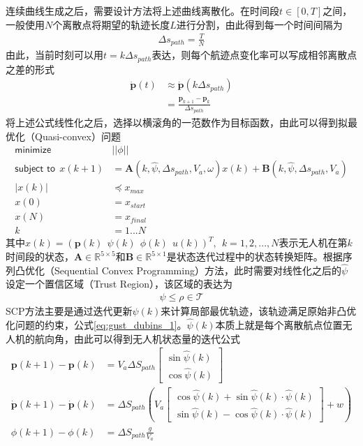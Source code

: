 连续曲线生成之后，需要设计方法将上述曲线离散化。在时间段$t \in [0, T]$之间，一般使用$N$个离散点将期望的轨迹长度$L$进行分割，由此得到每一个时间间隔为
\begin{align}
	\Delta s_{path} = \frac{T}{N}
\end{align}
由此，当前时刻可以用$t =k \Delta s_{path}$表达，则每个航迹点变化率可以写成相邻离散点之差的形式
\begin{align}
	\dot{\mathbf{p}}(t) &\approx \dot{\mathbf{p}}(k \Delta s_{path}) \\
	&= \frac{\mathbf{p}_{k+1}-\mathbf{p}_{k}}{\Delta s_{path}}
\end{align}
将上述公式线性化之后，选择以横滚角的一范数作为目标函数，由此可以得到拟最优化（Quasi-convex）问题
\begin{align}
	\textsf{minimize}\ \ &||\phi|| \\
	\textsf{subject to}\  \ x(k+1) &= \mathbf{A}(k, \hat{\psi}, \Delta s_{path}, {V}_a, \omega)x(k) + \mathbf{B}(k, \hat{\psi}, \Delta s_{path}, {V}_a) \nonumber  \\
	|x(k)| & \preceq x_{max} \nonumber \\
	x(0) &= x_{start} \nonumber \\
	x(N) &= x_{final} \nonumber \\
	k &= 1... N \nonumber
\end{align}
其中$x(k) = (\mathbf{p}(k)\ \ \psi(k)\ \ \phi(k)\ \ u(k))^T,\ \ k=1,2,...,N$表示无人机在第$k$时间段的状态，$\mathbf{A} \in \mathbb{R}^{5\times5}$和$\mathbf{B} \in \mathbb{R}^{5\times1}$是状态迭代过程中的状态转换矩阵。根据序列凸优化（Sequential Convex Programming）方法，此时需要对线性化之后的$\hat\psi$设定一个置信区域（Trust Region），该区域的表达为
\begin{align}
	\psi \le \rho \in \mathcal{T}
\end{align}
SCP方法主要是通过迭代更新$\hat{\psi}(k)$来计算局部最优轨迹，该轨迹满足原始非凸优化问题的约束，公式\ref{eq:gust_dubins_1}。$\hat{\psi}(k)$本质上就是每个离散航点位置无人机的航向角，由此可以得到无人机状态量的迭代公式
\begin{align}
	\mathbf{p}(k+1) - \mathbf{p}(k)  &= V_a \Delta S_{path} \begin{bmatrix} \sin \hat{\psi}(k) \\ \cos\hat{\psi}(k)   \end{bmatrix} \\
	\dot{\mathbf{p}}(k+1) - \dot{\mathbf{p}}(k) &=  \Delta S_{path} (V_a \begin{bmatrix} \cos \hat{\psi}(k) + \sin \hat{\psi}(k)\cdot \hat{\psi}(k) \\ \sin \hat{\psi}(k) - \cos \hat{\psi}(k)\cdot \hat{\psi}(k)  \end{bmatrix} + w) \\
	\phi(k+1) - \phi(k) &=   \Delta S_{path}  \frac{g}{V_a} 
\end{align}

